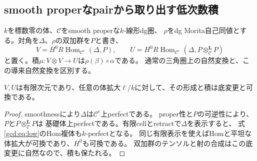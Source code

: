 \subsection{smooth properなpairから取り出す低次数積}

$k$を標数零の体、$\mathcal C$をsmooth properな$k$-線形dg圏、
$\rho$をdg Morita自己同値とする。対角を$\Delta$、$\rho$の双加群を$P$と書き、
\begin{equation}\label{gcd:eq:low}
 V=H^0R\operatorname{Hom}_{\mathcal C^e}(\Delta,P),\qquad
 U=H^0R\operatorname{Hom}_{\mathcal C^e}(\Delta,P\otimes_{\mathcal C}^{\mathbf L}P)
\end{equation}
と置く。積$\mu:V\otimes V\to U$は$\rho(\beta)\circ\alpha$である。
通常の三角圏上の自然変換と、この導来自然変換を区別する。

\begin{lemma}[低次数積の体拡大との両立]\label{gcd:lem:basechange}
$V,U$は有限次元であり、任意の体拡大$\ell/k$に対して、その形成と積は底変更と可換である。
\end{lemma}
\begin{proof}
smoothnessにより$\Delta$は$\mathcal C^e$上perfectである。
proper性と$P$の可逆性により、$P$と$P\otimes_{\mathcal C}^{\mathbf L}P$は
基礎体上perfectである。有限cellとretractで$\Delta$を表示すると、
式\eqref{gcd:eq:low}のHom複体も$k$-perfectとなる。
同じ有限表示を使えばHomと平坦な体拡大が可換であり、$H^0$も可換である。
双加群のテンソルと射の合成はこの底変更に自然なので、積も保たれる。
\end{proof}

